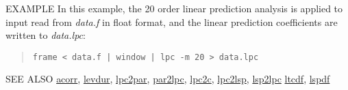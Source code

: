 \begin{options}
\end{options}

\begin{qsection}{EXAMPLE}
In this example, the 20 order linear prediction analysis is applied
to input read from {\em data.f} in float format,
and the linear prediction coefficients are written to
{\em data.lpc}:
\begin{quote}
 \verb!frame < data.f | window | lpc -m 20 > data.lpc!
\end{quote} 
\end{qsection}

\begin{qsection}{SEE ALSO}
\hyperlink{acorr}{acorr},
\hyperlink{levdur}{levdur},
\hyperlink{lpc2par}{lpc2par},
\hyperlink{par2lpc}{par2lpc},
\hyperlink{lpc2c}{lpc2c},
\hyperlink{lpc2lsp}{lpc2lsp},
\hyperlink{lsp2lpc}{lsp2lpc}
\hyperlink{ltcdf}{ltcdf},
\hyperlink{lspdf}{lspdf}
\end{qsection}

